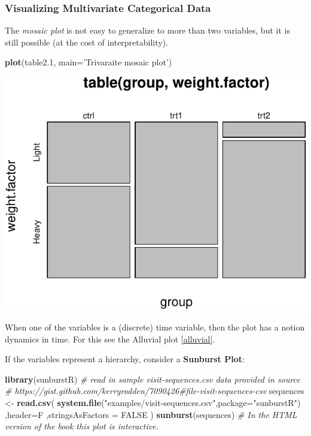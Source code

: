 \documentclass[]{book}
\newenvironment{Shaded}{\begin{snugshade}}{\end{snugshade}}
\newcommand{\CommentTok}[1]{\textcolor[rgb]{0.56,0.35,0.01}{\textit{#1}}}
\newcommand{\DataTypeTok}[1]{\textcolor[rgb]{0.13,0.29,0.53}{#1}}
\newcommand{\FloatTok}[1]{\textcolor[rgb]{0.00,0.00,0.81}{#1}}
\newcommand{\KeywordTok}[1]{\textcolor[rgb]{0.13,0.29,0.53}{\textbf{#1}}}
\newcommand{\NormalTok}[1]{#1}
\newcommand{\OtherTok}[1]{\textcolor[rgb]{0.56,0.35,0.01}{#1}}
\newcommand{\StringTok}[1]{\textcolor[rgb]{0.31,0.60,0.02}{#1}}
\theoremstyle{definition}
\theoremstyle{definition}
\theoremstyle{definition}
\theoremstyle{remark}
\begin{document}
\hypertarget{visualizing-multivariate-categorical-data}{%
\subsubsection{Visualizing Multivariate Categorical Data}\label{visualizing-multivariate-categorical-data}}

The \emph{mosaic plot} is not easy to generalize to more than two variables, but it is still possible (at the cost of interpretability).

\begin{Shaded}
\begin{Highlighting}[]
\KeywordTok{plot}\NormalTok{(table2}\FloatTok{.1}\NormalTok{, }\DataTypeTok{main=}\StringTok{'Trivaraite mosaic plot'}\NormalTok{)}
\end{Highlighting}
\end{Shaded}

\includegraphics[width=0.5\linewidth]{Rcourse_files/figure-latex/unnamed-chunk-130-1}

When one of the variables is a (discrete) time variable, then the plot has a notion dynamics in time. For this see the Alluvial plot \ref{alluvial}.

If the variables represent a hierarchy, consider a \textbf{Sunburst Plot}:

\begin{Shaded}
\begin{Highlighting}[]
\KeywordTok{library}\NormalTok{(sunburstR)}
\CommentTok{# read in sample visit-sequences.csv data provided in source}
\CommentTok{# https://gist.github.com/kerryrodden/7090426#file-visit-sequences-csv}
\NormalTok{sequences <-}\StringTok{ }\KeywordTok{read.csv}\NormalTok{(}
  \KeywordTok{system.file}\NormalTok{(}\StringTok{"examples/visit-sequences.csv"}\NormalTok{,}\DataTypeTok{package=}\StringTok{"sunburstR"}\NormalTok{)}
\NormalTok{  ,}\DataTypeTok{header=}\NormalTok{F}
\NormalTok{  ,}\DataTypeTok{stringsAsFactors =} \OtherTok{FALSE}
\NormalTok{)}
\KeywordTok{sunburst}\NormalTok{(sequences) }\CommentTok{# In the HTML version of the book this plot is interactive.}
\end{Highlighting}
\end{Shaded}
\end{document}
